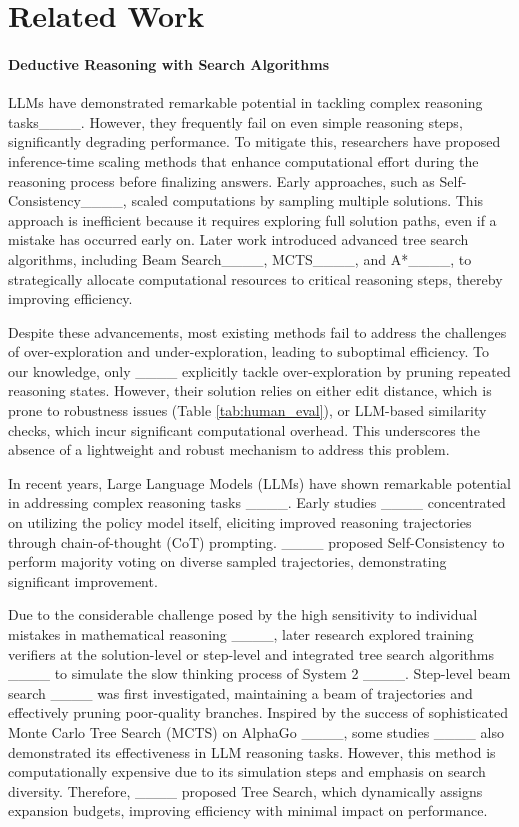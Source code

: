 \section{Related Work}
\paragraph{Deductive Reasoning with Search Algorithms}
LLMs have demonstrated remarkable potential in tackling complex reasoning tasks____.
However, they frequently fail on even simple reasoning steps, significantly degrading performance.
To mitigate this, researchers have proposed inference-time scaling methods that enhance computational effort during the reasoning process before finalizing answers.
Early approaches, such as Self-Consistency____, scaled computations by sampling multiple solutions.
This approach is inefficient because it requires exploring full solution paths, even if a mistake has occurred early on.
Later work introduced advanced tree search algorithms, including Beam Search____, MCTS____, and A*____, to strategically allocate computational resources to critical reasoning steps, thereby improving efficiency.

Despite these advancements, most existing methods fail to address the challenges of over-exploration and under-exploration, leading to suboptimal efficiency.
To our knowledge, only ____ explicitly tackle over-exploration by pruning repeated reasoning states. However, their solution relies on either edit distance, which is prone to robustness issues (Table \ref{tab:human_eval}), or LLM-based similarity checks, which incur significant computational overhead.
This underscores the absence of a lightweight and robust mechanism to address this problem.

\iffalse
In recent years, Large Language Models (LLMs) have shown remarkable potential in addressing complex reasoning tasks ____.
Early studies ____ concentrated on utilizing the policy model itself, eliciting improved reasoning trajectories through chain-of-thought (CoT) prompting.
____ proposed Self-Consistency to perform majority voting on diverse sampled trajectories, demonstrating significant improvement.

Due to the considerable challenge posed by the high sensitivity to individual mistakes in mathematical reasoning ____, later research explored training verifiers at the solution-level or step-level and integrated tree search algorithms ____ to simulate the slow thinking process of System 2 ____.
Step-level beam search ____ was first investigated, maintaining a beam of trajectories and effectively pruning poor-quality branches.
Inspired by the success of sophisticated Monte Carlo Tree Search (MCTS) on AlphaGo ____, some studies ____ also demonstrated its effectiveness in LLM reasoning tasks.
However, this method is computationally expensive due to its simulation steps and emphasis on search diversity.
Therefore, ____ proposed Tree Search, which dynamically assigns expansion budgets, improving efficiency with minimal impact on performance.

